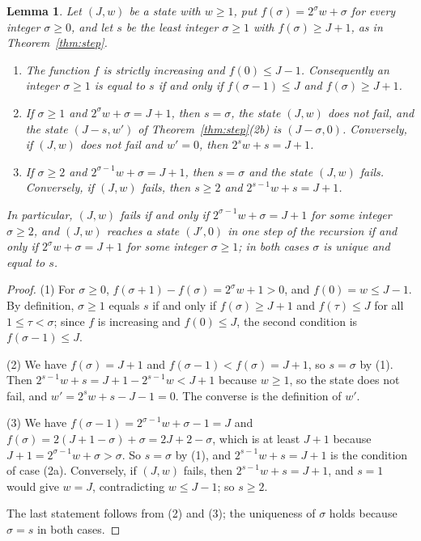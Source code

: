 \documentclass[11pt]{amsart}
\newtheorem{Lemma}[Theorem]{Lemma}
\theoremstyle{definition}
\begin{document}
\begin{Lemma}
\label{lem:least}
Let $(J,w)$ be a state with $w\ge1$, put $f(\sigma)=2^\sigma w+\sigma$ for every integer $\sigma\ge0$, and let $s$ be the least integer $\sigma\ge1$ with $f(\sigma)\ge J+1$, as in Theorem~\ref{thm:step}.
\begin{enumerate}
\item The function $f$ is strictly increasing and $f(0)\le J-1$. Consequently an integer $\sigma\ge1$ is equal to $s$ if and only if $f(\sigma-1)\le J$ and $f(\sigma)\ge J+1$.
\item If $\sigma\ge1$ and $2^{\sigma}w+\sigma=J+1$, then $s=\sigma$, the state $(J,w)$ does not fail, and the state $(J-s,w')$ of Theorem~\ref{thm:step}(2b) is $(J-\sigma,0)$. Conversely, if $(J,w)$ does not fail and $w'=0$, then $2^sw+s=J+1$.
\item If $\sigma\ge2$ and $2^{\sigma-1}w+\sigma=J+1$, then $s=\sigma$ and the state $(J,w)$ fails. Conversely, if $(J,w)$ fails, then $s\ge2$ and $2^{s-1}w+s=J+1$.
\end{enumerate}
In particular, $(J,w)$ fails if and only if $2^{\sigma-1}w+\sigma=J+1$ for some integer $\sigma\ge2$, and $(J,w)$ reaches a state $(J',0)$ in one step of the recursion if and only if $2^{\sigma}w+\sigma=J+1$ for some integer $\sigma\ge1$; in both cases $\sigma$ is unique and equal to $s$.
\end{Lemma}
\begin{proof}
(1) For $\sigma\ge0$, $f(\sigma+1)-f(\sigma)=2^\sigma w+1>0$, and $f(0)=w\le J-1$. By definition, $\sigma\ge1$ equals $s$ if and only if $f(\sigma)\ge J+1$ and $f(\tau)\le J$ for all $1\le\tau<\sigma$; since $f$ is increasing and $f(0)\le J$, the second condition is $f(\sigma-1)\le J$.

(2) We have $f(\sigma)=J+1$ and $f(\sigma-1)<f(\sigma)=J+1$, so $s=\sigma$ by (1). Then $2^{s-1}w+s=J+1-2^{s-1}w<J+1$ because $w\ge1$, so the state does not fail, and $w'=2^sw+s-J-1=0$. The converse is the definition of $w'$.

(3) We have $f(\sigma-1)=2^{\sigma-1}w+\sigma-1=J$ and $f(\sigma)=2(J+1-\sigma)+\sigma=2J+2-\sigma$, which is at least $J+1$ because $J+1=2^{\sigma-1}w+\sigma>\sigma$. So $s=\sigma$ by (1), and $2^{s-1}w+s=J+1$ is the condition of case (2a). Conversely, if $(J,w)$ fails, then $2^{s-1}w+s=J+1$, and $s=1$ would give $w=J$, contradicting $w\le J-1$; so $s\ge2$.

The last statement follows from (2) and (3); the uniqueness of $\sigma$ holds because $\sigma=s$ in both cases.
\end{proof}
\end{document}
